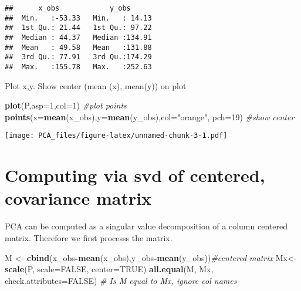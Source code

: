 \documentclass[]{article}
\newenvironment{Shaded}{\begin{snugshade}}{\end{snugshade}}
\newcommand{\KeywordTok}[1]{\textcolor[rgb]{0.13,0.29,0.53}{\textbf{#1}}}
\newcommand{\DataTypeTok}[1]{\textcolor[rgb]{0.13,0.29,0.53}{#1}}
\newcommand{\DecValTok}[1]{\textcolor[rgb]{0.00,0.00,0.81}{#1}}
\newcommand{\StringTok}[1]{\textcolor[rgb]{0.31,0.60,0.02}{#1}}
\newcommand{\CommentTok}[1]{\textcolor[rgb]{0.56,0.35,0.01}{\textit{#1}}}
\newcommand{\OtherTok}[1]{\textcolor[rgb]{0.56,0.35,0.01}{#1}}
\newcommand{\OperatorTok}[1]{\textcolor[rgb]{0.81,0.36,0.00}{\textbf{#1}}}
\newcommand{\NormalTok}[1]{#1}
\begin{document}
\begin{verbatim}
##      x_obs            y_obs       
##  Min.   :-53.33   Min.   : 14.13  
##  1st Qu.: 21.44   1st Qu.: 97.22  
##  Median : 44.37   Median :134.91  
##  Mean   : 49.58   Mean   :131.88  
##  3rd Qu.: 77.91   3rd Qu.:174.29  
##  Max.   :155.78   Max.   :252.63
\end{verbatim}

Plot x,y. Show center (mean (x), mean(y)) on plot

\begin{Shaded}
\begin{Highlighting}[]
\KeywordTok{plot}\NormalTok{(P,}\DataTypeTok{asp=}\DecValTok{1}\NormalTok{,}\DataTypeTok{col=}\DecValTok{1}\NormalTok{) }\CommentTok{#plot points}
\KeywordTok{points}\NormalTok{(}\DataTypeTok{x=}\KeywordTok{mean}\NormalTok{(x_obs),}\DataTypeTok{y=}\KeywordTok{mean}\NormalTok{(y_obs),}\DataTypeTok{col=}\StringTok{"orange"}\NormalTok{, }\DataTypeTok{pch=}\DecValTok{19}\NormalTok{) }\CommentTok{#show center}
\end{Highlighting}
\end{Shaded}

\texttt{[image: PCA\_files/figure-latex/unnamed-chunk-3-1.pdf]}

\hypertarget{computing-via-svd-of-centered-covariance-matrix}{%
\section{Computing via svd of centered, covariance
matrix}\label{computing-via-svd-of-centered-covariance-matrix}}

PCA can be computed as a singular value decomposition of a column
centered matrix. Therefore we first processs the matrix.

\begin{Shaded}
\begin{Highlighting}[]
\NormalTok{M <-}\StringTok{ }\KeywordTok{cbind}\NormalTok{(x_obs}\OperatorTok{-}\KeywordTok{mean}\NormalTok{(x_obs),y_obs}\OperatorTok{-}\KeywordTok{mean}\NormalTok{(y_obs))}\CommentTok{#centered matrix}
\NormalTok{Mx<-}\KeywordTok{scale}\NormalTok{(P, }\DataTypeTok{scale=}\OtherTok{FALSE}\NormalTok{, }\DataTypeTok{center=}\OtherTok{TRUE}\NormalTok{)}
\KeywordTok{all.equal}\NormalTok{(M, Mx, }\DataTypeTok{check.attributes=}\OtherTok{FALSE}\NormalTok{)  }\CommentTok{# Is M equal to Mx, ignore col names}
\end{Highlighting}
\end{Shaded}
\end{document}
